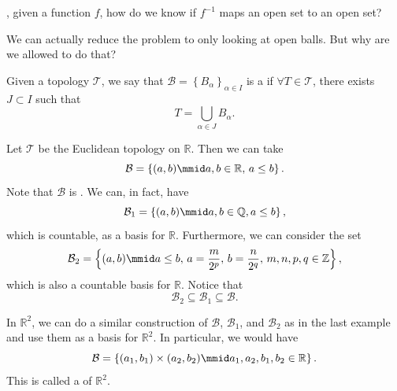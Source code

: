 \documentclass[notoc,notitlepage]{tufte-book}
\begin{document}
, given a function $f$,
how do we know if $f^{-1}$ maps an open set to an open set?

We can actually reduce the problem to only looking at open balls.
But why are we allowed to do that?

\begin{defn}\label{defn:basis_of_a_topology}
  Given a topology $\mathcal{T}$, we say that
  $\mathcal{B} = \left\{ B_{\alpha} \right\}_{\alpha \in I}$
  is a  if $\forall T \in \mathcal{T}$, there
  exists $J \subset I$ such that
  \begin{equation*}
    T = \bigcup_{\alpha \in J} B_\alpha.
  \end{equation*}
\end{defn}

\begin{eg}\label{eg:basis_of_r_n}
  Let $\mathcal{T}$ be the Euclidean topology on $\mathbb{R}$.
  Then we can take
  \begin{equation*}
    \mathcal{B} = \left\{ (a, b) \mmid a, b \in \mathbb{R}, \, a \leq b \right\}.
  \end{equation*}
  Note that $\mathcal{B}$ is .
  We can, in fact, have
  \begin{equation*}
    \mathcal{B}_1 = \left\{ (a, b) \mmid a, b \in \mathbb{Q}, a \leq b \right\},
  \end{equation*}
  which is countable, as a basis for $\mathbb{R}$.
  Furthermore, we can consider the set
  \begin{equation*}
    \mathcal{B}_2 = \left\{ (a, b) \mmid a \leq b, \, a = \frac{m}{2^p}, \, b = \frac{n}{2^q}, \, m, n, p, q \in \mathbb{Z} \right\},
  \end{equation*}
  which is also a countable basis for $\mathbb{R}$.
  Notice that
  \begin{equation*}
    \mathcal{B}_2 \subseteq \mathcal{B}_1 \subseteq \mathcal{B}.
  \end{equation*}
\end{eg}

\begin{eg}
  In $\mathbb{R}^2$, we can do a similar construction of $\mathcal{B}$,
  $\mathcal{B}_1$, and $\mathcal{B}_2$ as in the last example and use
  them as a basis for $\mathbb{R}^2$. In particular, we would have
  \begin{equation*}
    \mathcal{B} = \left\{ (a_1, b_1) \times (a_2, b_2) \mmid a_1, a_2, b_1, b_2 \in \mathbb{R} \right\}.
  \end{equation*}
  This is called a  of $\mathbb{R}^2$.
\end{eg}
\end{document}
